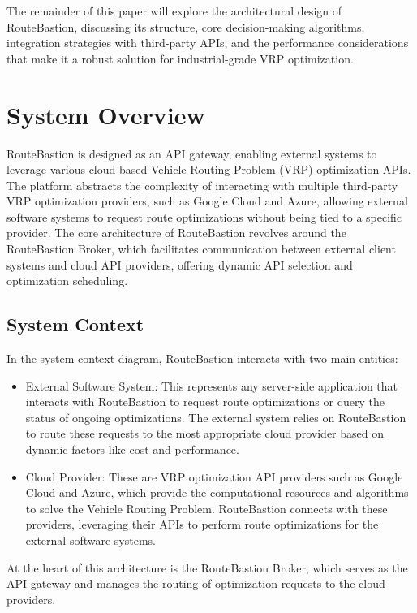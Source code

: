 \documentclass[english,notblind]{sbc20}
\begin{document}
The remainder of this paper will explore the architectural design of RouteBastion, discussing its structure, core decision-making algorithms, integration strategies with third-party APIs, and the performance considerations that make it a robust solution for industrial-grade VRP optimization.

\section{System Overview}
\label{sec:system_overview}
RouteBastion is designed as an API gateway, enabling external systems to leverage various cloud-based Vehicle Routing Problem (VRP) optimization APIs. The platform abstracts the complexity of interacting with multiple third-party VRP optimization providers, such as Google Cloud and Azure, allowing external software systems to request route optimizations without being tied to a specific provider. The core architecture of RouteBastion revolves around the RouteBastion Broker, which facilitates communication between external client systems and cloud API providers, offering dynamic API selection and optimization scheduling.

\subsection{System Context}
\label{sec:system_context}

In the system context diagram, RouteBastion interacts with two main entities:

\begin{itemize}
  \item External Software System: This represents any server-side application that interacts with RouteBastion to request route optimizations or query the status of ongoing optimizations. The external system relies on RouteBastion to route these requests to the most appropriate cloud provider based on dynamic factors like cost and performance.

  \item Cloud Provider: These are VRP optimization API providers such as Google Cloud and Azure, which provide the computational resources and algorithms to solve the Vehicle Routing Problem. RouteBastion connects with these providers, leveraging their APIs to perform route optimizations for the external software systems.
\end{itemize}

At the heart of this architecture is the RouteBastion Broker, which serves as the API gateway and manages the routing of optimization requests to the cloud providers.
\end{document}
